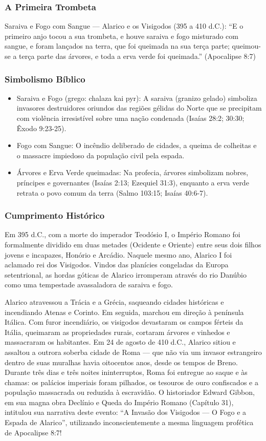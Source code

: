 \documentclass[11pt,a4paper,openany]{book}
\begin{document}
\subsubsection*{A Primeira Trombeta}
Saraiva e Fogo com Sangue — Alarico e os Visigodos (395 a 410 d.C.):
``E o primeiro anjo tocou a sua trombeta, e houve saraiva e fogo misturado com sangue, e foram lançados na terra, que foi queimada na sua terça parte; queimou-se a terça parte das árvores, e toda a erva verde foi queimada.'' (Apocalipse 8:7)


\subsubsection*{Simbolismo Bíblico}
\begin{itemize}
  \item Saraiva e Fogo (grego: chalaza kai pyr): A saraiva (granizo gelado) simboliza invasores destruidores oriundos das regiões gélidas do Norte que se precipitam com violência irresistível sobre uma nação condenada (Isaías 28:2; 30:30; Êxodo 9:23-25).
  \item Fogo com Sangue: O incêndio deliberado de cidades, a queima de colheitas e o massacre impiedoso da população civil pela espada.
  \item Árvores e Erva Verde queimadas: Na profecia, árvores simbolizam nobres, príncipes e governantes (Isaías 2:13; Ezequiel 31:3), enquanto a erva verde retrata o povo comum da terra (Salmo 103:15; Isaías 40:6-7).
\end{itemize}



\subsubsection*{Cumprimento Histórico}
Em 395 d.C., com a morte do imperador Teodósio I, o Império Romano foi formalmente dividido em duas metades (Ocidente e Oriente) entre seus dois filhos jovens e incapazes, Honório e Arcádio. Naquele mesmo ano, Alarico I foi aclamado rei dos Visigodos. Vindos das planícies congeladas da Europa setentrional, as hordas góticas de Alarico irromperam através do rio Danúbio como uma tempestade avassaladora de saraiva e fogo.

Alarico atravessou a Trácia e a Grécia, saqueando cidades históricas e incendiando Atenas e Corinto. Em seguida, marchou em direção à península Itálica. Com furor incendiário, os visigodos devastaram os campos férteis da Itália, queimaram as propriedades rurais, cortaram árvores e vinhedos e massacraram os habitantes. Em 24 de agosto de 410 d.C., Alarico sitiou e assaltou a outrora soberba cidade de Roma — que não via um invasor estrangeiro dentro de suas muralhas havia oitocentos anos, desde os tempos de Breno. Durante três dias e três noites ininterruptos, Roma foi entregue ao saque e às chamas: os palácios imperiais foram pilhados, os tesouros de ouro confiscados e a população massacrada ou reduzida à escravidão. O historiador Edward Gibbon, em sua magna obra Declínio e Queda do Império Romano (Capítulo 31), intitulou sua narrativa deste evento: ``A Invasão dos Visigodos — O Fogo e a Espada de Alarico'', utilizando inconscientemente a mesma linguagem profética de Apocalipse 8:7!
\end{document}

